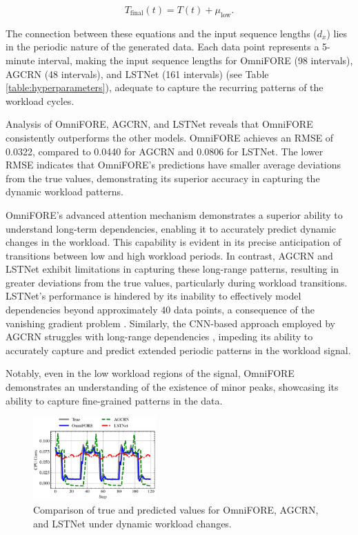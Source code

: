 \begin{equation}
T_{\text{final}}(t) = T(t) + \mu_{\text{low}}.
\end{equation}

The connection between these equations and the input sequence lengths ($d_x$) lies in the periodic nature of the generated data. Each data point represents a 5-minute interval, making the input sequence lengths for OmniFORE (98 intervals), AGCRN (48 intervals), and LSTNet (161 intervals) (see Table \ref{table:hyperparameters}), adequate to capture the recurring patterns of the workload cycles.

Analysis of OmniFORE, AGCRN, and LSTNet reveals that OmniFORE consistently outperforms the other models. OmniFORE achieves an RMSE of 0.0322, compared to 0.0440 for AGCRN and 0.0806 for LSTNet. The lower RMSE indicates that OmniFORE's predictions have smaller average deviations from the true values, demonstrating its superior accuracy in capturing the dynamic workload patterns.

OmniFORE's advanced attention mechanism demonstrates a superior ability to understand long-term dependencies, enabling it to accurately predict dynamic changes in the workload. This capability is evident in its precise anticipation of transitions between low and high workload periods. In contrast, AGCRN and LSTNet exhibit limitations in capturing these long-range patterns, resulting in greater deviations from the true values, particularly during workload transitions. LSTNet's performance is hindered by its inability to effectively model dependencies beyond approximately 40 data points, a consequence of the vanishing gradient problem \cite{zhou2021informer}. Similarly, the CNN-based approach employed by AGCRN struggles with long-range dependencies \cite{acmtimeseriesreview2024, hochreiter1998vanishing}, impeding its ability to accurately capture and predict extended periodic patterns in the workload signal.

Notably, even in the low workload regions of the signal, OmniFORE demonstrates an understanding of the existence of minor peaks, showcasing its ability to capture fine-grained patterns in the data.

\begin{figure}
\centering
\includegraphics[width=0.42\textwidth]{img/dynamic_workload_changes.eps}
\caption{Comparison of true and predicted values for OmniFORE, AGCRN, and LSTNet under dynamic workload changes.}
\label{fig:dynamic_workload_changes}
\end{figure}

